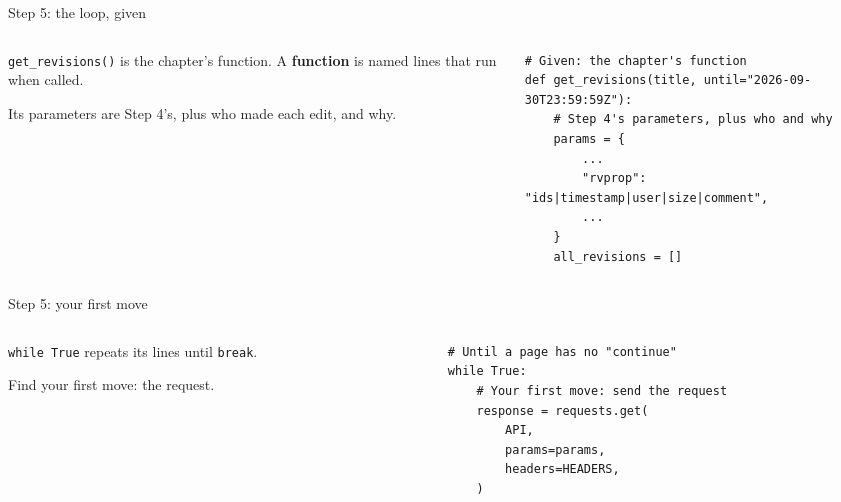 \documentclass[9pt,aspectratio=169]{beamer}
\begin{document}
\begin{frame}[fragile]{Step 5: the loop, given}
    \begin{columns}[T]
        \begin{column}{0.37\textwidth}
            \texttt{get\_revisions()} is the chapter's function. A \textbf{function} is named lines that run when called.

            \medskip
            Its parameters are Step 4's, plus who made each edit, and why.
        \end{column}
        \begin{column}{0.6\textwidth}
\begin{lstlisting}
# Given: the chapter's function
def get_revisions(title, until="2026-09-30T23:59:59Z"):
    # Step 4's parameters, plus who and why
    params = {
        ...
        "rvprop": "ids|timestamp|user|size|comment",
        ...
    }
    all_revisions = []
\end{lstlisting}
        \end{column}
    \end{columns}
\end{frame}

\begin{frame}[fragile]{Step 5: your first move}
    \begin{columns}[T]
        \begin{column}{0.37\textwidth}
            \texttt{while True} repeats its lines until \texttt{break}.

            \medskip
            Find your first move: the request.
        \end{column}
        \begin{column}{0.6\textwidth}
\begin{lstlisting}
    # Until a page has no "continue"
    while True:
        # Your first move: send the request
        response = requests.get(
            API,
            params=params,
            headers=HEADERS,
        )
\end{lstlisting}
        \end{column}
    \end{columns}
\end{frame}
\end{document}
